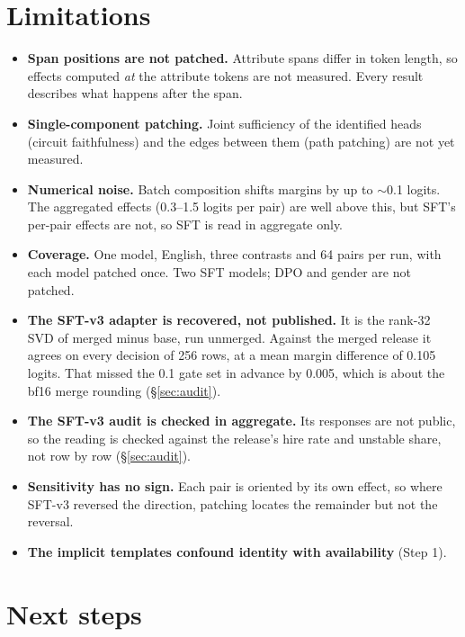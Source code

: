 \documentclass[11pt,a4paper]{article}
\begin{document}
\section{Limitations}
\begin{itemize}
  \item \textbf{Span positions are not patched.} Attribute spans differ in token length, so effects
        computed \emph{at} the attribute tokens are not measured. Every result describes what
        happens after the span.
  \item \textbf{Single-component patching.} Joint sufficiency of the identified heads (circuit
        faithfulness) and the edges between them (path patching) are not yet measured.
  \item \textbf{Numerical noise.} Batch composition shifts margins by up to $\sim$0.1 logits. The
        aggregated effects (0.3--1.5 logits per pair) are well above this, but SFT's per-pair
        effects are not, so SFT is read in aggregate only.
  \item \textbf{Coverage.} One model, English, three contrasts and 64 pairs per run, with each model
        patched once. Two SFT models; DPO and gender are not patched.
  \item \textbf{The SFT-v3 adapter is recovered, not published.} It is the rank-32 SVD of merged
        minus base, run unmerged. Against the merged release it agrees on every decision of 256
        rows, at a mean margin difference of 0.105 logits. That missed the 0.1 gate set in advance
        by 0.005, which is about the bf16 merge rounding (\S\ref{sec:audit}).
  \item \textbf{The SFT-v3 audit is checked in aggregate.} Its responses are not public, so the
        reading is checked against the release's hire rate and unstable share, not row by row
        (\S\ref{sec:audit}).
  \item \textbf{Sensitivity has no sign.} Each pair is oriented by its own effect, so where SFT-v3
        reversed the direction, patching locates the remainder but not the reversal.
  \item \textbf{The implicit templates confound identity with availability} (Step 1).
\end{itemize}

\section{Next steps}
\label{sec:next}
\end{document}
